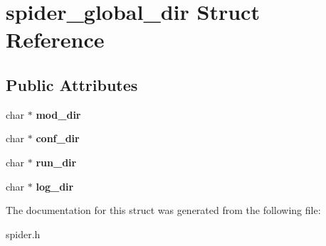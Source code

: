 \hypertarget{structspider__global__dir}{
\section{spider\_\-global\_\-dir Struct Reference}
\label{structspider__global__dir}
}
\subsection*{Public Attributes}
\begin{DoxyCompactItemize}
\item 
\hypertarget{structspider__global__dir_a06b9f48ce3ae8bffe32c222206b2447e}{
char $\ast$ {\bfseries mod\_\-dir}}
\label{structspider__global__dir_a06b9f48ce3ae8bffe32c222206b2447e}

\item 
\hypertarget{structspider__global__dir_a9ffb7b433a837986c857d4eec6a94a5b}{
char $\ast$ {\bfseries conf\_\-dir}}
\label{structspider__global__dir_a9ffb7b433a837986c857d4eec6a94a5b}

\item 
\hypertarget{structspider__global__dir_ad54b51dd08b499267cc37ad232bc7875}{
char $\ast$ {\bfseries run\_\-dir}}
\label{structspider__global__dir_ad54b51dd08b499267cc37ad232bc7875}

\item 
\hypertarget{structspider__global__dir_adfc17d39ed307c17e7903818108f71a7}{
char $\ast$ {\bfseries log\_\-dir}}
\label{structspider__global__dir_adfc17d39ed307c17e7903818108f71a7}

\end{DoxyCompactItemize}


The documentation for this struct was generated from the following file:\begin{DoxyCompactItemize}
\item 
spider.h\end{DoxyCompactItemize}
